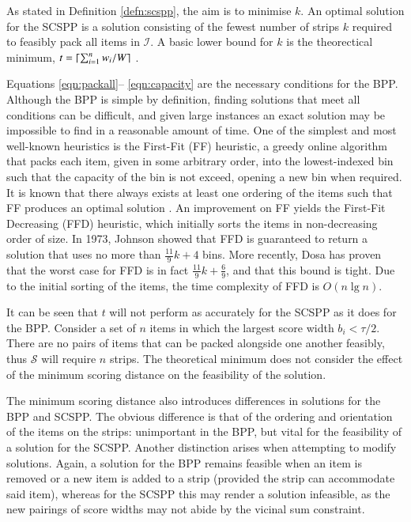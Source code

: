 \documentclass{elsarticle}
\begin{document}
\noindent As stated in Definition \ref{defn:scspp}, the aim is to minimise $k$. An optimal solution for the SCSPP is a solution consisting of the fewest number of strips $k$ required to feasibly pack all items in $\mathcal{I}$. A basic lower bound for $k$ is the theorectical minimum, $t = \lceil\sum_{i=1}^{n} w_i / W\rceil$ \cite{martello1990l}. 

Equations \eqref{eqn:packall}-- \eqref{eqn:capacity} are the necessary conditions for the BPP. Although the BPP is simple by definition, finding solutions that meet all conditions can be difficult, and given large instances an exact solution may be impossible to find in a reasonable amount of time. One of the simplest and most well-known heuristics is the First-Fit (FF) heuristic, a greedy online algorithm that packs each item, given in some arbitrary order, into the lowest-indexed bin such that the capacity of the bin is not exceed, opening a new bin when required. It is known that there always exists at least one ordering of the items such that FF produces an optimal solution \cite{lewis2009}. An improvement on FF yields the First-Fit Decreasing (FFD) heuristic, which initially sorts the items in non-decreasing order of size. In 1973, Johnson \cite{johnson1973} showed that FFD is guaranteed to return a solution that uses no more than $\frac{11}{9}k + 4$ bins. More recently, Dosa \cite{dosa2007} has proven that the worst case for FFD is in fact $\frac{11}{9}k + \frac{6}{9}$, and that this bound is tight. Due to the initial sorting of the items, the time complexity of FFD is $O(n \lg n)$.

It can be seen that $t$ will not perform as accurately for the SCSPP as it does for the BPP. Consider a set of $n$ items in which the largest score width $b_i < \tau/2$. There are no pairs of items that can be packed alongside one another feasibly, thus $\mathcal{S}$ will require $n$ strips. The theoretical minimum does not consider the effect of the minimum scoring distance on the feasibility of the solution. 

The minimum scoring distance also introduces differences in solutions for the BPP and SCSPP. The obvious difference is that of the ordering and orientation of the items on the strips: unimportant in the BPP, but vital for the feasibility of a solution for the SCSPP. Another distinction arises when attempting to modify solutions. Again, a solution for the BPP remains feasible when an item is removed or a new item is added to a strip (provided the strip can accommodate said item), whereas for the SCSPP this may render a solution infeasible, as the new pairings of score widths may not abide by the vicinal sum constraint.
\end{document}
